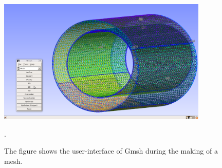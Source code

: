\begin{figure}\begin{center}
\includegraphics[width=100mm]{chapters/hentschel/pdf/gmsh.pdf}
\caption{The figure shows the user-interface of Gmsh during the making of a mesh.}
\label{fig:Gmsh_mesh}.
\end{center}\end{figure}

